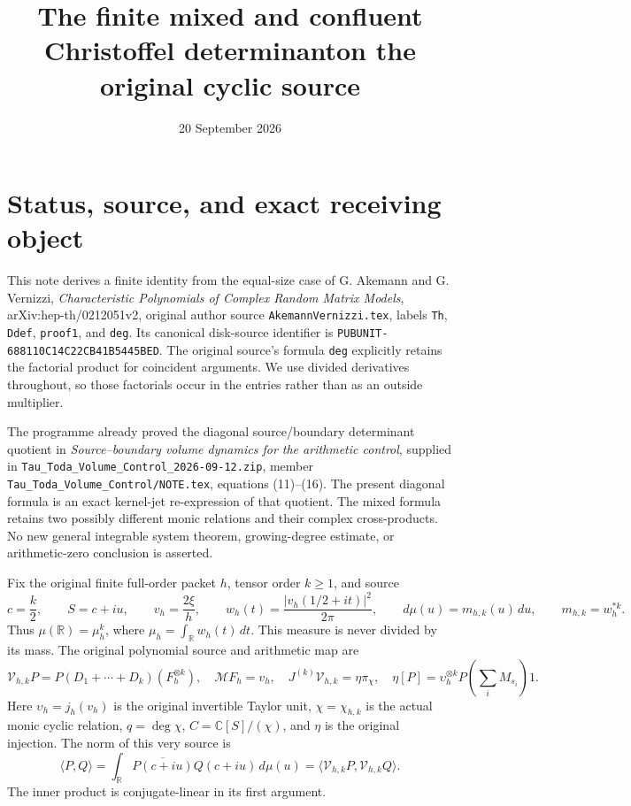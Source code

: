 \documentclass[11pt]{article}
\title{The finite mixed and confluent Christoffel determinant\newline on the original cyclic source}
\author{}
\date{20 September 2026}
\newcommand{\C}{\mathbb C}
\newcommand{\R}{\mathbb R}
\begin{document}
\maketitle

\section{Status, source, and exact receiving object}\label{sec:status}

This note derives a finite identity from the equal-size case of G. Akemann
and G. Vernizzi, \emph{Characteristic Polynomials of Complex Random Matrix
Models}, arXiv:hep-th/0212051v2, original author source
\texttt{AkemannVernizzi.tex}, labels \texttt{Th}, \texttt{Ddef},
\texttt{proof1}, and \texttt{deg}. Its canonical disk-source identifier is
\texttt{PUBUNIT-688110C14C22CB41B5445BED}. The original source's formula
\texttt{deg} explicitly retains the factorial product for coincident
arguments. We use divided derivatives throughout, so those factorials
occur in the entries rather than as an outside multiplier.

The programme already proved the diagonal source/boundary determinant
quotient in \emph{Source--boundary volume dynamics for the arithmetic
control}, supplied in \texttt{Tau\_Toda\_Volume\_Control\_2026-09-12.zip},
member \texttt{Tau\_Toda\_Volume\_Control/NOTE.tex}, equations (11)--(16).
The present diagonal formula is an exact kernel-jet re-expression of
that quotient. The mixed formula retains two possibly different monic
relations and their complex cross-products. No new general integrable
system theorem, growing-degree estimate, or arithmetic-zero conclusion
is asserted.

Fix the original finite full-order packet \(h\), tensor order \(k\geq1\),
and source
\begin{equation}\label{eq:source}
 c=\frac{k}{2},\qquad S=c+iu,\qquad
 v_h=\frac{2\xi}{h},\qquad
 w_h(t)=\frac{|v_h(1/2+it)|^2}{2\pi},\qquad
 d\mu(u)=m_{h,k}(u)\,du,\qquad m_{h,k}=w_h^{*k}.
\end{equation}
Thus \(\mu(\R)=\mu_h^k\), where \(\mu_h=\int_\R w_h(t)\,dt\).
This measure is never divided by its mass.
The original polynomial source and arithmetic map are
\begin{equation}\label{eq:original-maps}
 \mathcal V_{h,k}P
   =P(D_1+\cdots+D_k)(F_h^{\otimes k}),\quad
 \mathcal M F_h=v_h,\quad
 J^{(k)}\mathcal V_{h,k}=\eta\pi_\chi,
 \quad
 \eta[P]=\upsilon_h^{\otimes k}
             P\!\left(\sum_iM_{s_i}\right)1.
\end{equation}
Here \(\upsilon_h=j_h(v_h)\) is the original invertible Taylor unit,
\(\chi=\chi_{h,k}\) is the actual monic cyclic relation,
\(q=\deg\chi\), \(C=\C[S]/(\chi)\), and \(\eta\) is the original
injection. The norm of this very source is
\begin{equation}\label{eq:inner}
 \langle P,Q\rangle
 =\int_\R\overline{P(c+iu)}Q(c+iu)\,d\mu(u)
 =\langle\mathcal V_{h,k}P,\mathcal V_{h,k}Q\rangle.
\end{equation}
The inner product is conjugate-linear in its first argument.
\end{document}
